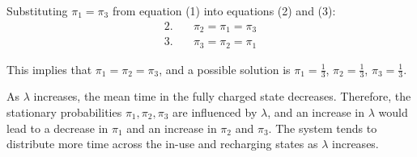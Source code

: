 \documentclass[answers]{exam}
\begin{document}
\begin{questions}
\begin{parts}
\begin{solution}
            Substituting \( \pi_1 = \pi_3 \) from equation (1) into equations (2) and (3):
            \begin{align*}
            2. & \quad \pi_2 = \pi_1 = \pi_3 \\
            3. & \quad \pi_3 = \pi_2 = \pi_1
            \end{align*}
            
            This implies that \( \pi_1 = \pi_2 = \pi_3 \), and a possible solution is \( \pi_1 = \frac{1}{3} \), \( \pi_2 = \frac{1}{3} \), \( \pi_3 = \frac{1}{3} \).
            
            As \( \lambda \) increases, the mean time in the fully charged state decreases. Therefore, the stationary probabilities \( \pi_1, \pi_2, \pi_3 \) are influenced by \( \lambda \), and an increase in \( \lambda \) would lead to a decrease in \( \pi_1 \) and an increase in \( \pi_2 \) and \( \pi_3 \). The system tends to distribute more time across the in-use and recharging states as \( \lambda \) increases.
            
                    \end{solution}

    \end{parts}
\end{questions}
\end{document}

